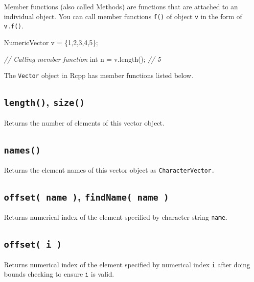 \documentclass[
]{book}
\newenvironment{Shaded}{\begin{snugshade}}{\end{snugshade}}
\newcommand{\CommentTok}[1]{\textcolor[rgb]{0.56,0.35,0.01}{\textit{#1}}}
\newcommand{\DataTypeTok}[1]{\textcolor[rgb]{0.13,0.29,0.53}{#1}}
\newcommand{\DecValTok}[1]{\textcolor[rgb]{0.00,0.00,0.81}{#1}}
\newcommand{\NormalTok}[1]{#1}
\begin{document}
Member functions (also called Methods) are functions that are attached to an individual object. You can call member functions \texttt{f()} of object \texttt{v} in the form of \texttt{v.f()}.

\begin{Shaded}
\begin{Highlighting}[]
\NormalTok{NumericVector v = \{}\DecValTok{1}\NormalTok{,}\DecValTok{2}\NormalTok{,}\DecValTok{3}\NormalTok{,}\DecValTok{4}\NormalTok{,}\DecValTok{5}\NormalTok{\};}

\CommentTok{// Calling member function}
\DataTypeTok{int}\NormalTok{ n = v.length(); }\CommentTok{// 5}
\end{Highlighting}
\end{Shaded}

The \texttt{Vector} object in Rcpp has member functions listed below.

\hypertarget{length-size}{%
\subsection{\texorpdfstring{\texttt{length()}, \texttt{size()}}{length(), size()}}\label{length-size}}

Returns the number of elements of this vector object.

\hypertarget{names}{%
\subsection{\texorpdfstring{\texttt{names()}}{names()}}\label{names}}

Returns the element names of this vector object as \texttt{CharacterVector.}

\hypertarget{offset-name-findname-name}{%
\subsection{\texorpdfstring{\texttt{offset(\ name\ )}, \texttt{findName(\ name\ )}}{offset( name ), findName( name )}}\label{offset-name-findname-name}}

Returns numerical index of the element specified by character string \texttt{name}.

\hypertarget{offset-i}{%
\subsection{\texorpdfstring{\texttt{offset(\ i\ )}}{offset( i )}}\label{offset-i}}

Returns numerical index of the element specified by numerical index \texttt{i} after doing bounds checking to ensure \texttt{i} is valid.
\end{document}
